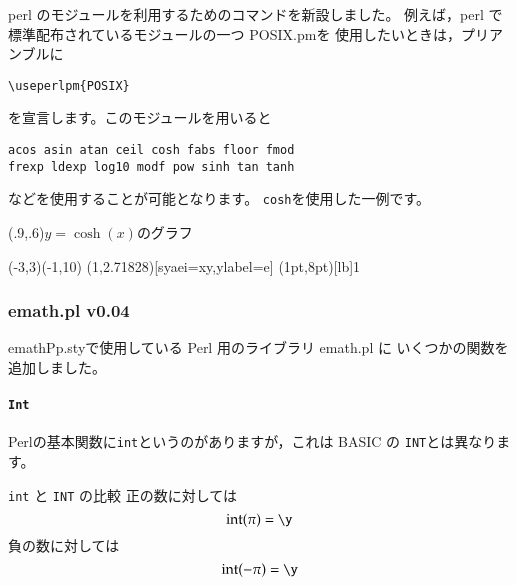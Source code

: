 \subsubsection{}
perl のモジュールを利用するためのコマンドを新設しました。
例えば，perl で標準配布されているモジュールの一つ \textsf{POSIX.pm}を
使用したいときは，プリアンブルに
\begin{jquote}
\begin{verbatim}
\useperlpm{POSIX}
\end{verbatim}
\end{jquote}
を宣言します。このモジュールを用いると
\begin{jquote}
\begin{verbatim}
acos asin atan ceil cosh fabs floor fmod
frexp ldexp log10 modf pow sinh tan tanh
\end{verbatim}
\end{jquote}
などを使用することが可能となります。
\texttt{cosh}を使用した一例です。

\begin{showEx}(.9,.6){$y=\cosh(x)$のグラフ}
\begin{zahyou}[ul=6mm,Ueyohaku=1\zh](-3,3)(-1,10)
  \def\E{(1,2.71828)}\Put\E[syaei=xy,ylabel=e]{}
  (1pt,8pt)[lb]{1}
  \Put{}
  \Put{}
  {\Thicklines{}\Put{}}
\end{zahyou}
\end{showEx}

\subsubsection{emath.pl v0.04}
\textsf{emathPp.sty}で使用している Perl 用のライブラリ \textsf{emath.pl} に
いくつかの関数を追加しました。

\paragraph{\texttt{Int}}
\textsf{Perl}の基本関数に\texttt{int}というのがありますが，これは BASIC の
\texttt{INT}とは異なります。

\begin{showEx}{\texttt{int} と \texttt{INT} の比較}
正の数に対しては
\y
\[ \mathrm{int}(\pi)=\y \]
負の数に対しては
\y
\[ \mathrm{int}(-\pi)=\y \]
\end{showEx}
\bigskip

